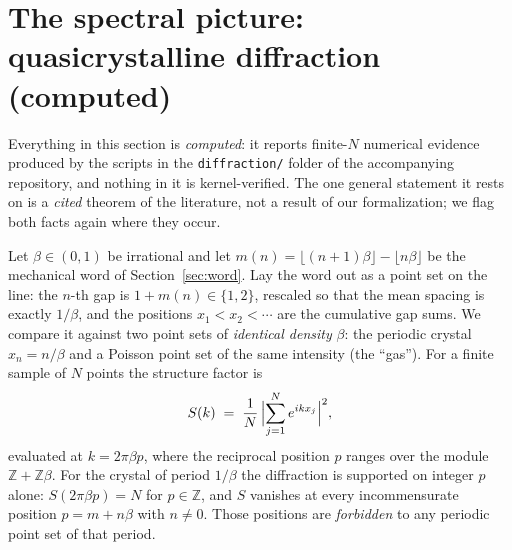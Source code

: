 \documentclass[11pt]{amsart}
\theoremstyle{plain}
\theoremstyle{definition}
\theoremstyle{remark}
\begin{document}
\section{The spectral picture: quasicrystalline diffraction (computed)}
\label{sec:spectral}

Everything in this section is \emph{computed}: it reports finite-$N$ numerical
evidence produced by the scripts in the \texttt{diffraction/} folder of the
accompanying repository, and nothing in it is kernel-verified. The one general
statement it rests on is a \emph{cited} theorem of the literature, not a result
of our formalization; we flag both facts again where they occur.

Let $\beta \in (0,1)$ be irrational and let
$m(n) = \lfloor (n+1)\beta \rfloor - \lfloor n\beta \rfloor$ be the mechanical
word of Section~\ref{sec:word}. Lay the word out as a point set on the line:
the $n$-th gap is $1 + m(n) \in \{1, 2\}$, rescaled so that the mean spacing is
exactly $1/\beta$, and the positions $x_1 < x_2 < \cdots$ are the cumulative
gap sums. We compare it against two point sets of \emph{identical density}
$\beta$: the periodic crystal $x_n = n/\beta$ and a Poisson point set of the
same intensity (the ``gas''). For a finite sample of $N$ points the structure
factor is
\[
  S(k) \;=\; \frac{1}{N}\,\Bigl\lvert \sum_{j=1}^{N} e^{i k x_j} \Bigr\rvert^{2},
\]
evaluated at $k = 2\pi\beta p$, where the reciprocal position $p$ ranges over
the module $\mathbb{Z} + \mathbb{Z}\beta$. For the crystal of period $1/\beta$
the diffraction is supported on integer $p$ alone: $S(2\pi\beta p) = N$ for
$p \in \mathbb{Z}$, and $S$ vanishes at every incommensurate position
$p = m + n\beta$ with $n \neq 0$. Those positions are \emph{forbidden} to any
periodic point set of that period.
\end{document}
